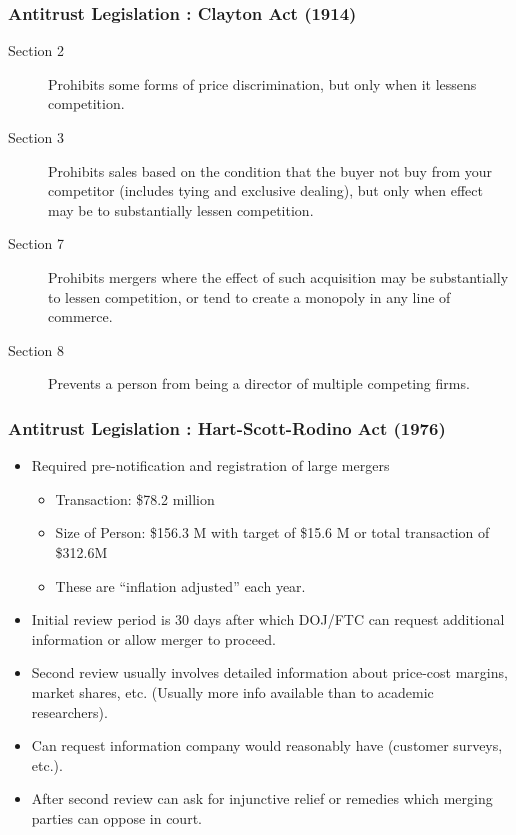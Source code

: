 \documentclass[xcolor=pdftex,dvipsnames,table,mathserif,aspectratio=169]{beamer}
\begin{document}
\begin{frame}
\frametitle{Antitrust Legislation : Clayton Act (1914)}
 \begin{description}
\item [Section 2] Prohibits some forms of price discrimination, but only when it lessens competition.
\item [Section 3] Prohibits sales based on the condition that the buyer not buy from your competitor (includes tying and exclusive dealing), but only when effect may be to substantially lessen competition.
\item [Section 7] Prohibits mergers where the effect of such acquisition may be substantially to lessen competition, or tend to create a monopoly in any line of commerce.
\item [Section 8] Prevents a person from being a director of multiple competing firms.
 \end{description}
\end{frame}

\begin{frame}
\frametitle{Antitrust Legislation : Hart-Scott-Rodino Act (1976)}
 \begin{itemize}
\item Required pre-notification and registration of large mergers
\begin{itemize}
\item Transaction: \$78.2 million
\item Size of Person: \$156.3 M with target of \$15.6 M or total transaction of \$312.6M
\item These are ``inflation adjusted'' each year.
\end{itemize}
\item Initial review period is 30 days after which DOJ/FTC can request additional information or allow merger to proceed.
\item Second review usually involves detailed information about  price-cost margins, market shares, etc. (Usually more info available than to academic researchers).
\item Can request information company would reasonably have (customer surveys, etc.).
\item After second review can ask for \alert{injunctive relief} or \alert{remedies} which merging parties can oppose in court.
 \end{itemize}
\end{frame}
\end{document}

